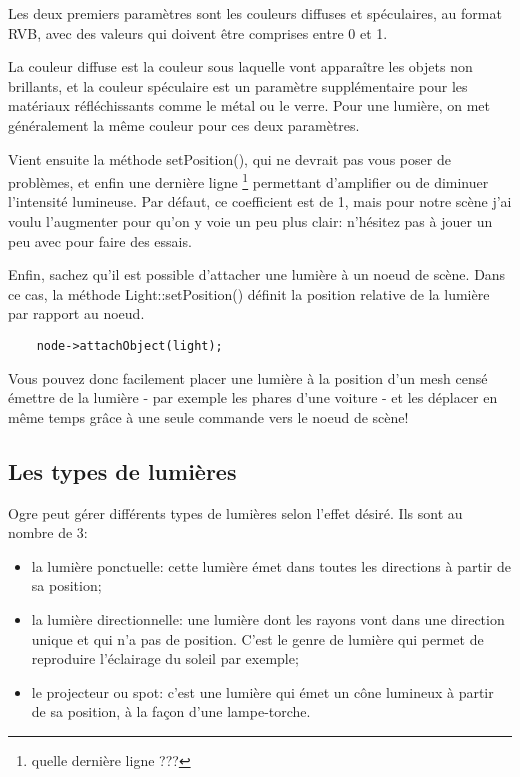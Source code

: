 Les deux premiers param\`etres sont les couleurs diffuses et sp\'eculaires, au format RVB, avec des valeurs qui doivent \^etre comprises entre 0 et 1.

La couleur diffuse est la couleur sous laquelle vont appara\^itre les objets non brillants, et la couleur sp\'eculaire est un param\`etre suppl\'ementaire pour les mat\'eriaux r\'efl\'echissants comme le m\'etal ou le verre. Pour une lumi\`ere, on met g\'en\'eralement la m\^eme couleur pour ces deux param\`etres.

Vient ensuite la m\'ethode setPosition(), qui ne devrait pas vous poser de probl\`emes, et enfin une derni\`ere ligne \footnote{quelle derni\`ere ligne ???} permettant d'amplifier ou de diminuer l'intensit\'e lumineuse. Par d\'efaut, ce coefficient est de 1, mais pour notre sc\`ene j'ai voulu l'augmenter pour qu'on y voie un peu plus clair: n'h\'esitez pas \`{a} jouer un peu avec pour faire des essais.

Enfin, sachez qu'il est possible d'attacher une lumi\`ere \`{a} un noeud de sc\`ene. Dans ce cas, la m\'ethode Light::setPosition() d\'efinit la position relative de la lumi\`ere par rapport au noeud.
\begin{lstlisting}
	node->attachObject(light);
\end{lstlisting}


Vous pouvez donc facilement placer une lumi\`ere \`{a} la position d'un mesh cens\'e \'emettre de la lumi\`ere - par exemple les phares d'une voiture - et les d\'eplacer en m\^eme temps gr\^{a}ce \`{a} une seule commande vers le noeud de sc\`ene!





\subsection{Les types de lumi\`eres}

Ogre peut g\'erer diff\'erents types de lumi\`eres selon l'effet d\'esir\'e. Ils sont au nombre de 3:

\begin{itemize}
\item la lumi\`ere ponctuelle: cette lumi\`ere \'emet dans toutes les directions \`{a} partir de sa position;
\item la lumi\`ere directionnelle: une lumi\`ere dont les rayons vont dans une direction unique et qui n'a pas de position. C'est le genre de lumi\`ere qui permet de reproduire l'\'eclairage du soleil par exemple;
\item le projecteur ou spot: c'est une lumi\`ere qui \'emet un c\^one lumineux \`{a} partir de sa position, \`{a} la fa\c{c}on d'une lampe-torche.
\end{itemize}
    





